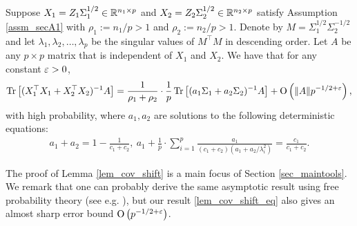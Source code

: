 \begin{lemma}\label{lem_cov_shift}
	Suppose $X_1=Z_1\Sigma_1^{1/2}\in \mathbb{R}^{n_1\times p}$ and $X_2=Z_2\Sigma_2^{1/2}\in \mathbb{R}^{n_2\times p}$ satisfy Assumption \ref{assm_secA1} with $\rho_1:=n_1/p>1$ and $\rho_2:=n_2/p>1$. 
	Denote by $M = \Sigma_1^{1/2}\Sigma_2^{-1/2}$ and let $\lambda_1, \lambda_2, \dots, \lambda_p$ be the singular values of $M^{\top}M$ in descending order. Let $A$ be any $p\times p$ matrix that is independent of $X_1$ and $X_2$. We have that for any constant ${\varepsilon}>0$,
	\begin{align}\label{lem_cov_shift_eq}
		\operatorname{Tr}\left[(X_1^{\top}X_1 + X_2^{\top}X_2)^{-1}A\right] = \frac{1}{\rho_1+\rho_2}\cdot \frac1p\operatorname{Tr}\left[ (a_1 \Sigma_1 + a_2\Sigma_2)^{-1} A\right] +\operatorname{O}\left(\|A\| p^{-1/2+\varepsilon}\right),
	\end{align}
with high probability, where $a_1, a_2$ are solutions to the following deterministic equations:
	\begin{align*}
		a_1 + a_2 = 1- \frac{1}{c_1 + c_2},~ a_1 + \frac{1}{p}\cdot\sum_{i=1}^p \frac{a_1}{(c_1 + c_2)(a_1 + a_2/ \lambda_i^2)} = \frac{c_1}{c_1 + c_2}. \label{eq_a12}
	\end{align*}
\end{lemma}
The proof of Lemma \ref{lem_cov_shift} is a main focus of Section \ref{sec_maintools}. We remark that one can probably derive the same asymptotic result using free probability theory (see e.g. \cite{nica2006lectures}), but our result \eqref{lem_cov_shift_eq} also gives an almost sharp error bound $\operatorname{O}\left( p^{-1/2+\varepsilon}\right)$.


